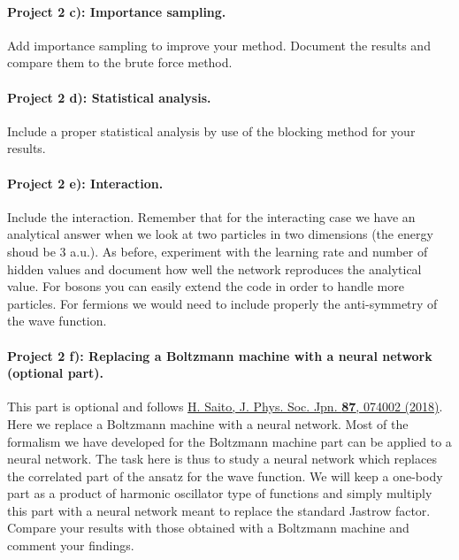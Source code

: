\documentclass[%
oneside,                 %
final,                   %
10pt]{article}
\begin{document}
\paragraph{Project 2 c): Importance sampling.}
Add importance sampling to improve your method. Document the results and compare them to the brute force method.

\paragraph{Project 2 d): Statistical analysis.}
Include a proper statistical analysis by use of the blocking method for your results.

\paragraph{Project 2 e): Interaction.}
Include the interaction. Remember that for the interacting case we
have an analytical answer when we look at two particles in two
dimensions (the energy shoud be 3 a.u.). 
As before, experiment with the learning rate and
number of hidden values and document how well the network reproduces
the analytical value.
For bosons you can easily extend the code in order to handle more particles. For fermions we would need to include properly the anti-symmetry of the wave function. 

\paragraph{Project 2 f): Replacing a Boltzmann machine with a neural network (optional part).}
This part is optional and follows \href{{https://journals.jps.jp/doi/10.7566/JPSJ.87.074002}}{H. Saito, J. Phys. Soc. Jpn. \textbf{87}, 074002 (2018)}. Here we replace a Boltzmann machine with a neural network. Most of the formalism we have developed for the Boltzmann machine part can be applied to a neural network. The task here is thus to study a neural network which replaces the correlated part of the ansatz for the wave function. We will keep a one-body part as a product of harmonic oscillator type of functions and simply multiply this part with a neural network  meant to replace the standard Jastrow factor. Compare your results with those obtained with a Boltzmann machine and comment your findings.
\end{document}

